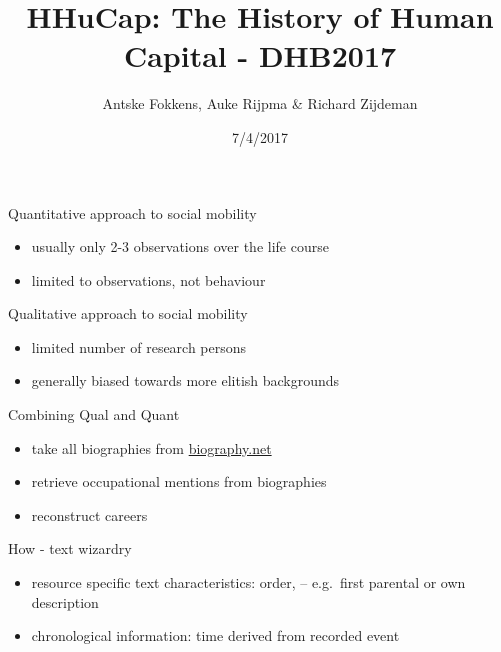 \documentclass[ignorenonframetext,]{beamer}
\title{HHuCap: The History of Human Capital - DHB2017}
\author{Antske Fokkens, Auke Rijpma \& Richard Zijdeman}
\date{7/4/2017}
\providecommand{\tightlist}{%
\setlength{\itemsep}{0pt}\setlength{\parskip}{0pt}}
\begin{document}
\frame{\titlepage}

\begin{frame}
\tableofcontents[hideallsubsections]
\end{frame}

\begin{frame}{Quantitative approach to social mobility}

\begin{itemize}
\tightlist
\item
  usually only 2-3 observations over the life course
\item
  limited to observations, not behaviour
\end{itemize}

\end{frame}

\begin{frame}{Qualitative approach to social mobility}

\begin{itemize}
\tightlist
\item
  limited number of research persons
\item
  generally biased towards more elitish backgrounds
\end{itemize}

\end{frame}

\begin{frame}{Combining Qual and Quant}

\begin{itemize}
\tightlist
\item
  take all biographies from
  \href{http://www.biographynet.nl}{biography.net}
\item
  retrieve occupational mentions from biographies
\item
  reconstruct careers
\end{itemize}

\end{frame}

\begin{frame}{How - text wizardry}

\begin{itemize}
\tightlist
\item
  resource specific text characteristics: order, -- e.g.~first parental
  or own description
\item
  chronological information: time derived from recorded event
\end{itemize}

\end{frame}
\end{document}
